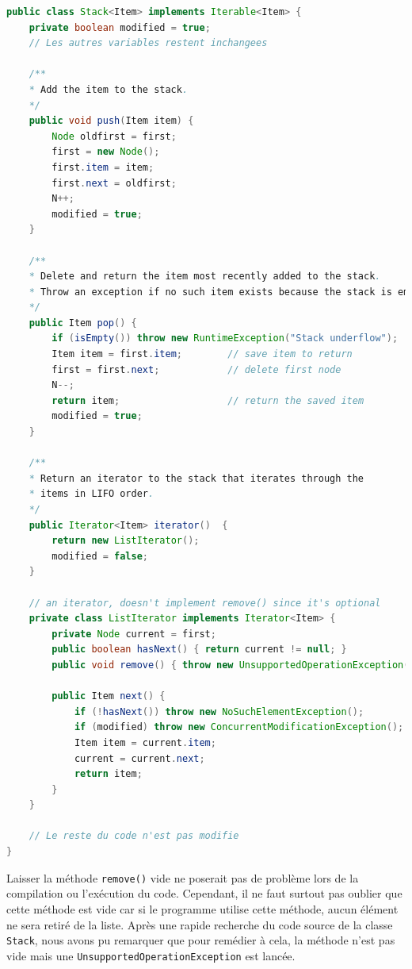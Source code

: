 \begin{enumerate}
	\begin{lstlisting}[language=Java]
public class Stack<Item> implements Iterable<Item> {
    private boolean modified = true;
    // Les autres variables restent inchangees
	 
    /**
    * Add the item to the stack.
    */
    public void push(Item item) {
        Node oldfirst = first;
        first = new Node();
        first.item = item;
        first.next = oldfirst;
        N++;
        modified = true;
    }
	 
    /**
    * Delete and return the item most recently added to the stack.
    * Throw an exception if no such item exists because the stack is empty.
    */
    public Item pop() {
        if (isEmpty()) throw new RuntimeException("Stack underflow");
        Item item = first.item;        // save item to return
        first = first.next;            // delete first node
        N--;
        return item;                   // return the saved item
        modified = true;
    }
    
    /**
    * Return an iterator to the stack that iterates through the 
    * items in LIFO order.
    */
    public Iterator<Item> iterator()  { 
    	return new ListIterator();
    	modified = false;
    }

    // an iterator, doesn't implement remove() since it's optional
    private class ListIterator implements Iterator<Item> {
        private Node current = first;
        public boolean hasNext() { return current != null; }
        public void remove() { throw new UnsupportedOperationException(); }

        public Item next() {
            if (!hasNext()) throw new NoSuchElementException();
            if (modified) throw new ConcurrentModificationException();
            Item item = current.item;
            current = current.next; 
            return item;
        }
    }
    
    // Le reste du code n'est pas modifie	 
}
	 \end{lstlisting}
	 \vspace{0.5cm}
	 
        Laisser la méthode \lstinline{remove()} vide
        ne poserait pas de problème lors de la compilation ou
        l'exécution du code. Cependant, il ne faut surtout pas
        oublier que cette méthode est vide car si le programme
        utilise cette méthode, aucun élément ne sera retiré de
        la liste. Après une rapide recherche du code source de
        la classe \lstinline{Stack}, nous avons pu remarquer que pour remédier
        à cela, la méthode n'est pas vide mais une
        \lstinline{UnsupportedOperationException} est lancée.
	 

\end{enumerate}
